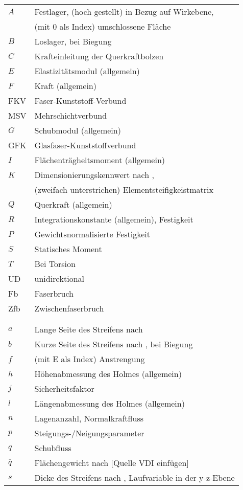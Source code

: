 \begin{longtable}{ll}
\onehalfspacing
$ A $&Festlager, (hoch gestellt) in Bezug auf Wirkebene,\\
&(mit 0 als Index) umschlossene Fläche\\
$ B $&Loslager, bei Biegung\\
$ C $&Krafteinleitung der Querkraftbolzen\\
$ E $&Elastizitätsmodul (allgemein)\\
$ F $&Kraft (allgemein)\\
FKV&Faser-Kunststoff-Verbund\\
MSV&Mehrschichtverbund\\
$ G $&Schubmodul (allgemein)\\
GFK& Glasfaser-Kunststoffverbund\\
$ I $&Flächenträgheitsmoment (allgemein)\\
$ K $&Dimensionierungskennwert nach \cite{item5},\\
 &  (zweifach unterstrichen) Elementsteifigkeistmatrix\\
$ Q $&Querkraft (allgemein)\\
$ R $&Integrationskonstante (allgemein), Festigkeit\\
$ P $&Gewichtsnormalisierte Festigkeit\\
$ S $&Statisches Moment\\
$ T $&Bei Torsion\\
UD&unidirektional\\
Fb&Faserbruch\\
Zfb&Zwischenfaserbruch\\
& \\
& \\
$ a $&Lange Seite des Streifens nach \cite{item1}\\
$ b $&Kurze Seite des Streifens nach \cite{item1}, bei Biegung\\
$ f $&(mit E als Index) Anstrengung\\
$ h $&Höhenabmessung des Holmes (allgemein)\\
$ j $&Sicherheitsfaktor\\
$ l $&Längenabmessung des Holmes (allgemein)\\
$ n $&Lagenanzahl, Normalkraftfluss\\
$ p $&Steigungs-/Neigungsparameter\\
$ q $&Schubfluss\\
$ \bar{q} $&Flächengewicht nach [Quelle VDI einfügen]\\
$ s $&Dicke des Streifens nach \cite{item1}, Laufvariable in der	y-z-Ebene\\

\end{longtable}
